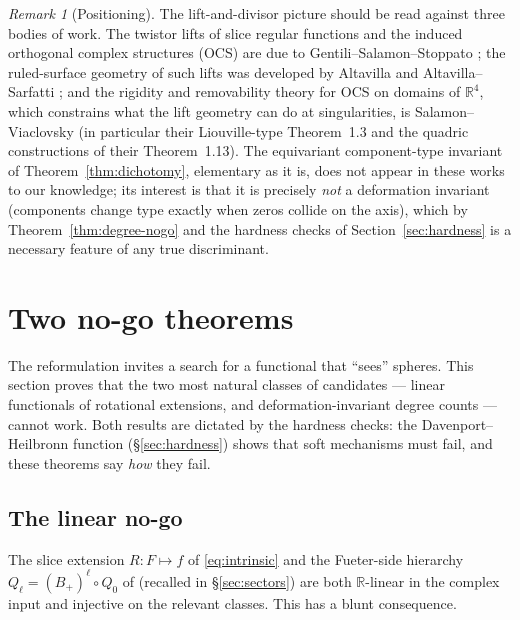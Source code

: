 \documentclass[11pt]{amsart}
\theoremstyle{plain}
\theoremstyle{definition}
\theoremstyle{remark}
\newtheorem{remark}[theorem]{Remark}
\newcommand{\RR}{\mathbb{R}}
\begin{document}
\begin{remark}[Positioning]\label{rem:positioning}
The lift-and-divisor picture should be read against three bodies of work. The twistor lifts of
slice regular functions and the induced orthogonal complex structures (OCS) are due to
Gentili--Salamon--Stoppato \cite{GSS2014}; the ruled-surface geometry of such lifts was developed
by Altavilla and Altavilla--Sarfatti \cite{Altavilla2018,AltavillaSarfatti2019}; and the rigidity
and removability theory for OCS on domains of $\RR^4$, which constrains what the lift geometry can
do at singularities, is Salamon--Viaclovsky \cite{SalamonViaclovsky2009} (in particular their
Liouville-type Theorem~1.3 and the quadric constructions of their Theorem~1.13). The equivariant
component-type invariant of Theorem~\ref{thm:dichotomy}, elementary as it is, does not appear in
these works to our knowledge; its interest is that it is precisely \emph{not} a deformation
invariant (components change type exactly when zeros collide on the axis), which by
Theorem~\ref{thm:degree-nogo} and the hardness checks of Section~\ref{sec:hardness} is a necessary
feature of any true discriminant.
\end{remark}

\section{Two no-go theorems}\label{sec:nogo}

The reformulation invites a search for a functional that ``sees'' spheres. This section proves
that the two most natural classes of candidates --- linear functionals of rotational extensions,
and deformation-invariant degree counts --- cannot work. Both results are dictated by the hardness
checks: the Davenport--Heilbronn function (\S\ref{sec:hardness}) shows that soft mechanisms must
fail, and these theorems say \emph{how} they fail.

\subsection{The linear no-go}

The slice extension $R\colon F\mapsto f$ of \eqref{eq:intrinsic} and the Fueter-side hierarchy
$Q_\ell=(B_+)^\ell\circ Q_0$ of \cite{Baker2015} (recalled in \S\ref{sec:sectors}) are both
$\RR$-linear in the complex input and injective on the relevant classes. This has a blunt
consequence.
\end{document}

